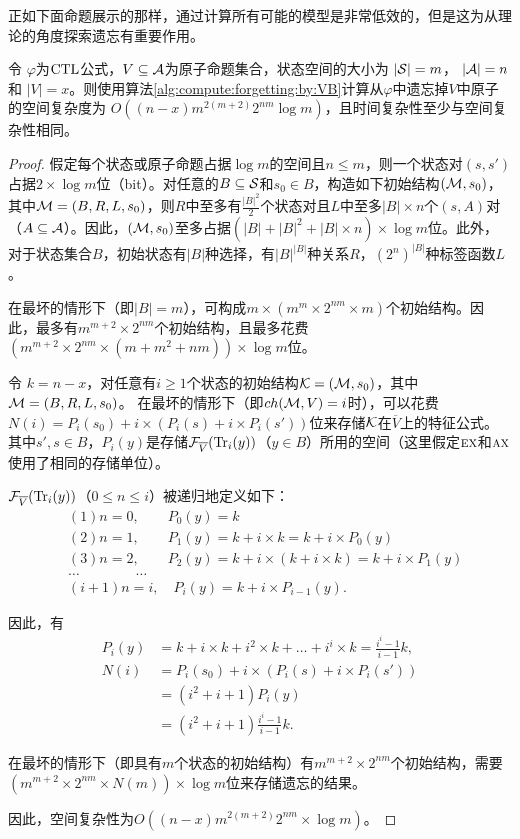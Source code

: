 正如下面命题展示的那样，通过计算所有可能的模型是非常低效的，但是这为从理论的角度探索遗忘有重要作用。


\begin{proposition}\label{pro:time:alg1}
	令 $\varphi$为$\textrm{CTL}$公式，$V\subseteq {\cal A}$为原子命题集合，状态空间的大小为 $|{\cal S}|=m$， $|{\cal A}|=n$ 和 $|V|=x$。则使用算法\ref{alg:compute:forgetting:by:VB}计算从$\varphi$中遗忘掉$V$中原子的空间复杂度为 $O((n-x)m^{2(m+2)}2^{nm}  \log m)$，且时间复杂性至少与空间复杂性相同。
\end{proposition}
\begin{proof}
	假定每个状态或原子命题占据$\log m$的空间且$n\leq m$，则一个状态对$(s,s')$占据$2\times \log m$位（bit）。对任意的$B \subseteq {\cal S}$和$s_0\in B$，构造如下初始结构$({\cal M},s_0)$，其中${\cal M} = (B,R,L,s_0)$，则$R$中至多有$\frac{|B|^2}{2}$个状态对且$L$中至多$|B|\times n$个$(s,A)$对（$A\subseteq {\cal A}$）。因此，$({\cal M},s_0)$至多占据$(|B|+|B|^2+|B|\times n)\times \log m$位。此外，对于状态集合$B$，初始状态有$|B|$种选择，有$|B|^{|B|}$种关系$R$，$(2^n)^{|B|}$种标签函数$L$。
	
	在最坏的情形下（即$|B|=m$），可构成$m \times  (m^m \times  2^{nm} \times  m)$个初始结构。因此，最多有$m^{m+2} \times  2^{nm}$个初始结构，且最多花费$(m^{m+2} \times  2^{nm} \times  (m + m^2 + nm))\times  \log m$位。
	
	令 $k = n-x$，对任意有$i\geq 1$个状态的初始结构${\cal K} = ({\cal M},s_0)$，其中${\cal M} = (B,R,L,s_0)$。
	在最坏的情形下（即$ch({\cal M},V) = i$时），可以花费$N(i) = P_i(s_0) + i \times  (P_i(s) + i \times P_i(s'))$位来存储${\cal K}$在$\overline{V}$上的特征公式。
	其中$s',s\in B$，$P_i(y)$是存储${\cal F}_{\overline{V}}(\textrm{Tr}_i(y))$（$y\in B$）所用的空间（这里假定$\textsc{e}\textsc{x}$和$\textsc{a}\textsc{x}$使用了相同的存储单位）。
	
	${\cal F}_{\overline{V}}(\textrm{Tr}_i(y))$（$0\leq n \leq i$）被递归地定义如下：
	\begin{align*}
		&(1) n=0,  \qquad P_0(y) = k\\
		&(2) n=1, \qquad  P_1(y) = k + i\times k = k + i\times P_0(y)\\
		&(3) n=2, \qquad P_2(y) = k + i\times (k + i\times k) = k+i\times P_1(y)\\
		& \dots \qquad \qquad \dots\\
		&(i+1) n = i, \quad P_i(y) = k + i \times  P_{i-1}(y).
	\end{align*}
	
	因此，有
	\begin{align*}
		P_i(y) & = k + i\times k + i^2 \times  k + \dots + i^i \times  k = \frac{i^i -1}{i-1} k,\\
		N(i) & = P_i(s_0) + i\times  (P_i(s) + i \times  P_i(s'))\\
		& = (i^2 + i +1) P_i(y) \\
		& = (i^2 + i+1)\frac{i^i -1}{i-1} k.
	\end{align*}
	
	在最坏的情形下（即具有$m$个状态的初始结构）有$m^{m+2} \times  2^{nm}$个初始结构，需要$(m^{m+2} \times  2^{nm} \times  N(m)) \times  \log m$位来存储遗忘的结果。
	
	因此，空间复杂性为$O((n-x)m^{2(m+2)}2^{nm}\times  \log m)$。
\end{proof}



